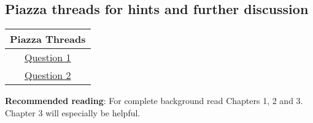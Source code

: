 \documentclass[12pt]{article}
\begin{document}
\hrulefill
\pagebreak

\subsection*{Piazza threads for hints and further discussion}
\begin{center}
    \begin{tabular}{|c|}
    \hline
    Piazza Threads \\ [0.5ex] 
    \hline \hline 
    \href{https://piazza.com/class/ka2roz7rb9m3j4?cid=13}{Question 1}\\
    \href{https://piazza.com/class/ka2roz7rb9m3j4?cid=14}{Question 2}\\

    \hline
    \end{tabular}
\end{center}

\textbf{Recommended reading}: For complete background read Chapters 1, 2 and 3. Chapter 3 will especially be helpful. 
\end{document}
